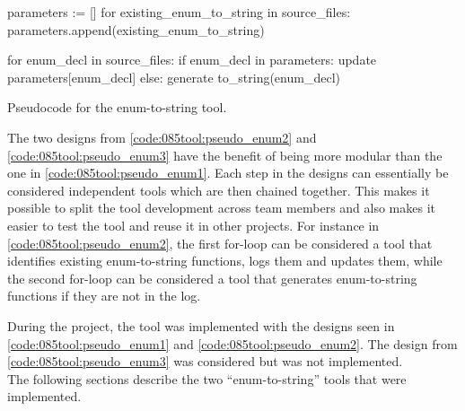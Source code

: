 \begin{listing}[H]
    \begin{pythoncode}
parameters := []
for existing_enum_to_string in source_files:
    parameters.append(existing_enum_to_string)

for enum_decl in source_files:
    if enum_decl in parameters:
        update parameters[enum_decl]
    else:
        generate to_string(enum_decl)
    \end{pythoncode}
    \caption{Pseudocode for the enum-to-string tool.}
    \label{code:085tool:pseudo_enum3}
\end{listing}

The two designs from \cref{code:085tool:pseudo_enum2} and \cref{code:085tool:pseudo_enum3} have the benefit of being more modular than the one in \ref{code:085tool:pseudo_enum1}.
Each step in the designs can essentially be considered independent tools which are then chained together. This makes it possible to split the tool development across team members and also makes it easier to test the tool and reuse it in other projects. For instance in \cref{code:085tool:pseudo_enum2}, the first for-loop can be considered a tool that identifies existing enum-to-string functions, logs them and updates them, while the second for-loop can be considered a tool that generates enum-to-string functions if they are not in the log.

During the project, the tool was implemented with the designs seen in \cref{code:085tool:pseudo_enum1} and \cref{code:085tool:pseudo_enum2}. The design from \cref{code:085tool:pseudo_enum3} was considered but was not implemented. \\The following sections describe the two ``enum-to-string'' tools that were implemented.